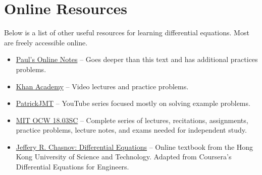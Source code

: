 \section{Online Resources}
\noindent
Below is a list of other useful resources for learning differential equations. Most are freely accessible online.
\begin{itemize}
	\item
		\href{http://tutorial.math.lamar.edu/Classes/DE/DE.aspx}{Paul's Online Notes} -- Goes deeper than this text and has additional practices problems.
	\item
		\href{https://www.khanacademy.org/math/differential-equations}{Khan Academy} -- Video lectures and practice problems.
	\item
		\href{https://www.youtube.com/playlist?list=PLD4B0062CA82D73FB}{PatrickJMT} -- YouTube series focused mostly on solving example problems.
	\item
		\href{https://ocw.mit.edu/courses/mathematics/18-03sc-differential-equations-fall-2011/}{MIT OCW 18.03SC} -- Complete series of lectures, recitations, assignments, practice problems, lecture notes, and exams needed for independent study.
	\item
		\href{https://www.math.ust.hk/~machas/differential-equations.pdf}{Jeffery R. Chasnov: Differential Equations} -- Online textbook from the Hong Kong University of Science and Technology. Adapted from Coursera's Differential Equations for Engineers.
\end{itemize}